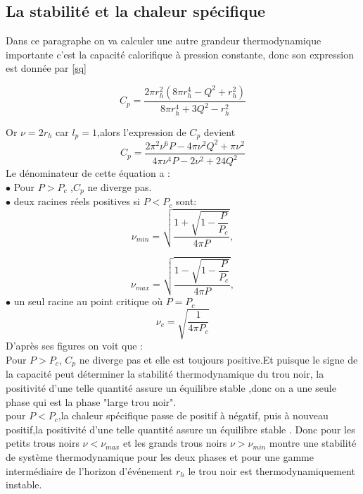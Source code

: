 \documentclass[12pt,  a4paper, openright]{report} %
\begin{document}
\subsection{ La stabilité et la chaleur spécifique}
Dans ce paragraphe on va calculer une autre grandeur thermodynamique importante c’est
la capacité calorifique à pression constante, donc son expression est donnée par \ref{sq}

$$C_{p}=\dfrac{2\pi r_{h}^{2}(8\pi r_{h}^{4}-Q^{2}+r_{h}^{2})}{8\pi r_{h}^{4}+3Q^{2}-r_{h}^{2}}$$

Or $\nu=2r_{h}$ car $l_{p}=1$,alors l'expression de $C_{p}$ devient 
\begin{equation}
C_{p}=\dfrac{2\pi^{2}\nu^{6}P-4\pi \nu^{2}Q^{2}+\pi \nu^{2}}{4\pi \nu^{4}P-2\nu^{2}+24Q^{2}}
\end{equation}
Le dénominateur de cette équation a :\\
$\bullet$ Pour $P>P_{c}$ ,$C_{p}$ ne diverge pas.\\

$\bullet$ deux racines réels positives si $P<P_{c}$ sont:
\begin{equation}
\nu_{min}=\sqrt{\dfrac{1+\sqrt{1-\dfrac{P}{P_{c}}}}{4\pi P}},
\end{equation} 

\begin{equation}
\nu_{max}=\sqrt{\dfrac{1-\sqrt{1-\dfrac{P}{P_{c}}}}{4\pi P}},
\end{equation}
$\bullet$ un seul racine au point critique où $P = P_{c}$
\begin{equation}
\nu_{c}=\sqrt{\dfrac{1}{4\pi P_{c}}}
\end{equation} 
D'après ses figures on voit que :\\

Pour $P > P_{c}$, $C_{p}$ ne diverge pas et elle est toujours positive.Et puisque le signe de la capacité peut déterminer la stabilité thermodynamique du trou noir, la positivité d’une telle quantité assure un équilibre stable ,donc on a une seule phase qui est la phase "large trou noir".\\
pour $P < P_{c}$,la chaleur spécifique passe de positif à négatif, puis à nouveau positif,la positivité d’une telle quantité assure un équilibre stable \cite{22}. Donc  pour les petits trous noirs  $\nu<\nu_{max}$ et les grands trous noirs $\nu>\nu_{min}$ montre une stabilité de système  thermodynamique pour les deux phases et  pour
une gamme intermédiaire de l'horizon d'événement $ r_{h}$ le trou noir est thermodynamiquement instable.\\
\end{document}
